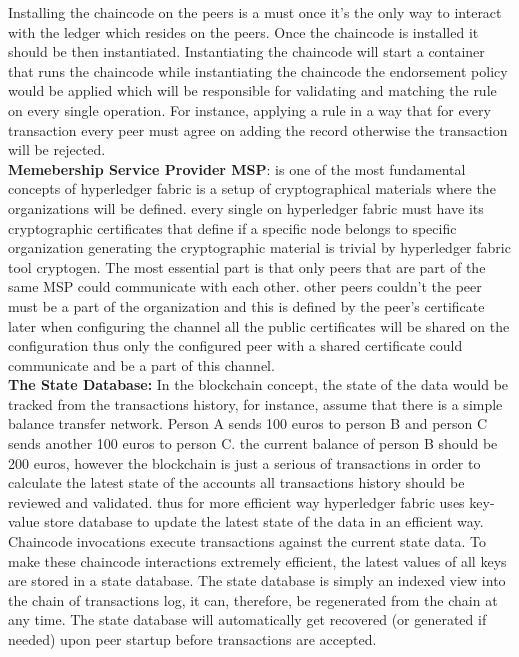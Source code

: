 Installing the chaincode on the peers is a must once it's the only way to interact with the ledger which resides on the peers. 
Once the chaincode is installed it should be then instantiated. 
Instantiating the chaincode will start a container that runs the chaincode while instantiating the chaincode the endorsement policy would be applied which will be responsible for validating and matching the rule on every single operation. For instance, applying a rule in a way  that for every transaction every peer must agree on adding the record otherwise the transaction will be rejected. \\
 
\textbf{Memebership Service Provider MSP}: is one of the most fundamental concepts of hyperledger fabric is a setup of cryptographical materials where the organizations will be defined. every single on hyperledger fabric must have its cryptographic certificates that define if a specific node belongs to specific organization generating the cryptographic material is trivial by hyperledger fabric tool cryptogen. 
The most essential part is that only peers that are part of the same MSP could communicate with each other. other peers couldn't the peer must be a part of the organization and this is defined by the peer's certificate later when configuring the channel all the public certificates will be shared on the configuration thus only the configured peer with a shared certificate could communicate and be a part of this channel. \\

\textbf{The State Database:} In the blockchain concept, the state of the data would be tracked from the transactions history, for instance, assume that there is a simple balance transfer network. Person A sends 100 euros to person B and person C sends another 100 euros to person C. the current balance of person B should be 200 euros, however the blockchain is just a serious of transactions in order to calculate the latest state of the accounts all transactions history should be reviewed and validated. thus for more efficient way hyperledger fabric uses key-value store database to update the latest state of the data in an efficient way.
Chaincode invocations execute transactions against the current state data. To make these chaincode interactions extremely efficient, the latest values of all keys are stored in a state database. The state database is simply an indexed view into the chain of transactions log, it can, therefore, be regenerated from the chain at any time. The state database will automatically get recovered (or generated if needed) upon peer startup before transactions are accepted.\\

